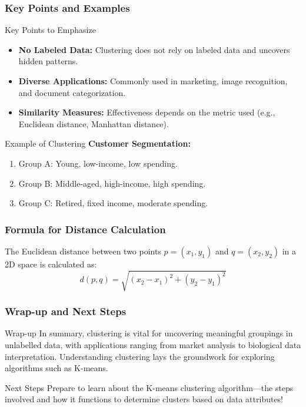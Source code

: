 \documentclass{beamer}
\begin{document}
\begin{frame}[fragile]
    \frametitle{Key Points and Examples}
    \begin{block}{Key Points to Emphasize}
        \begin{itemize}
            \item \textbf{No Labeled Data:} Clustering does not rely on labeled data and uncovers hidden patterns.
            \item \textbf{Diverse Applications:} Commonly used in marketing, image recognition, and document categorization.
            \item \textbf{Similarity Measures:} Effectiveness depends on the metric used (e.g., Euclidean distance, Manhattan distance).
        \end{itemize}
    \end{block}
    
    \begin{block}{Example of Clustering}
        \textbf{Customer Segmentation:}
        \begin{enumerate}
            \item Group A: Young, low-income, low spending.
            \item Group B: Middle-aged, high-income, high spending.
            \item Group C: Retired, fixed income, moderate spending.
        \end{enumerate}
    \end{block}
\end{frame}

\begin{frame}[fragile]
    \frametitle{Formula for Distance Calculation}
    The Euclidean distance between two points \( p = (x_1, y_1) \) and \( q = (x_2, y_2) \) in a 2D space is calculated as:
    \begin{equation}
        d(p, q) = \sqrt{(x_2 - x_1)^2 + (y_2 - y_1)^2}
    \end{equation}
\end{frame}

\begin{frame}[fragile]
    \frametitle{Wrap-up and Next Steps}
    \begin{block}{Wrap-up}
        In summary, clustering is vital for uncovering meaningful groupings in unlabelled data, with applications ranging from market analysis to biological data interpretation. Understanding clustering lays the groundwork for exploring algorithms such as K-means.
    \end{block}
    
    \begin{block}{Next Steps}
        Prepare to learn about the K-means clustering algorithm—the steps involved and how it functions to determine clusters based on data attributes!
    \end{block}
\end{frame}
\end{document}
